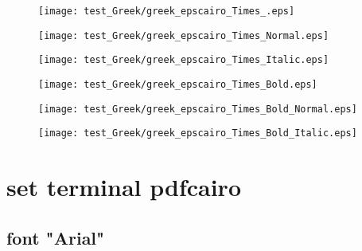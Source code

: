 \documentclass{ltjsarticle}
\begin{document}
			\begin{figure}[ht]
				\centering
				\begin{minipage}{0.3\columnwidth}
					\texttt{[image: test\_Greek/greek\_epscairo\_Times\_.eps]}
				\end{minipage}
				\begin{minipage}{0.3\columnwidth}
					\texttt{[image: test\_Greek/greek\_epscairo\_Times\_Normal.eps]}
				\end{minipage}
				\begin{minipage}{0.3\columnwidth}
					\texttt{[image: test\_Greek/greek\_epscairo\_Times\_Italic.eps]}
				\end{minipage}
				\begin{minipage}{0.3\columnwidth}
					\texttt{[image: test\_Greek/greek\_epscairo\_Times\_Bold.eps]}
				\end{minipage}
				\begin{minipage}{0.3\columnwidth}
					\texttt{[image: test\_Greek/greek\_epscairo\_Times\_Bold\_Normal.eps]}
				\end{minipage}
				\begin{minipage}{0.3\columnwidth}
					\texttt{[image: test\_Greek/greek\_epscairo\_Times\_Bold\_Italic.eps]}
				\end{minipage}
			\end{figure}
			\clearpage%
	\section{set terminal pdfcairo}

		\subsection{font "Arial"}
\end{document}
